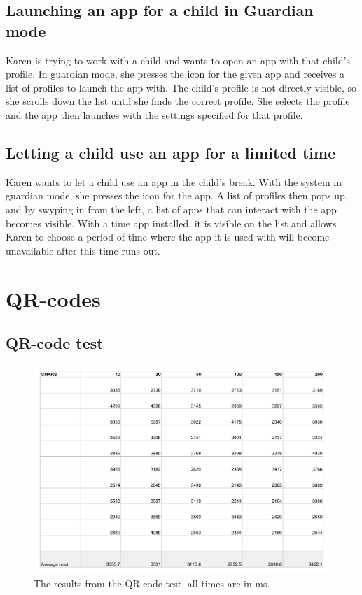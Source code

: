 \section{Launching an app for a child in Guardian mode}
Karen is trying to work with a child and wants to open an app with that child's profile. 
In guardian mode, she presses the icon for the given app and receives a list of profiles to launch the app with. 
The child's profile is not directly visible, so she scrolls down the list until she finds the correct profile. 
She selects the profile and the app then launches with the settings specified for that profile.

\section{Letting a child use an app for a limited time}
Karen wants to let a child use an app in the child's break. 
With the system in guardian mode, she presses the icon for the app. 
A list of profiles then pops up, and by swyping in from the left, a list of apps that can interact with the app becomes visible. 
With a time app installed, it is visible on the list and allows Karen to choose a period of time where the app it is used with will become unavailable after this time runs out.

\chapter{QR-codes}
\section{QR-code test}
\begin{figure}[h!]
	\centering
	\includegraphics[scale=0.6]{gfx/QR-test.pdf}
	\caption{The results from the QR-code test, all times are in ms.}
	\label{fig:QR-code-test}
\end{figure}

